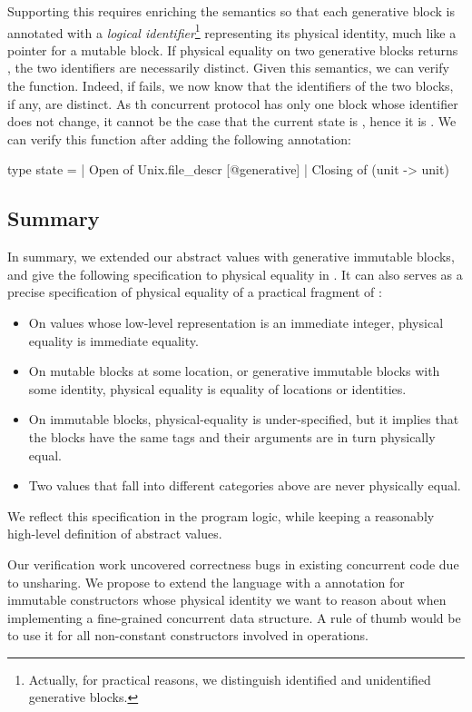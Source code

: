 Supporting this requires enriching the \Zoo semantics so that each generative block is annotated with a \emph{logical identifier}\footnote{Actually, for practical reasons, we distinguish identified and unidentified generative blocks.} representing its physical identity, much like a pointer for a mutable block.
If physical equality on two generative blocks returns , the two identifiers are necessarily distinct.
Given this semantics, we can verify the  function.
Indeed, if  fails, we now know that the identifiers of the two blocks, if any, are distinct.
As th concurrent protocol has only one  block whose identifier does not change, it cannot be the case that the current state is , hence it is .
We can verify this function after adding the following annotation:

\begin{ocamlcode}
type state =
  | Open of Unix.file_descr [@generative]
  | Closing of (unit -> unit)
\end{ocamlcode}

\subsection{Summary}

In summary, we extended our abstract values with generative immutable blocks, and give the following specification to physical equality in \ZooLang. It can also serves as a precise specification of physical equality of a practical fragment of \OCaml:

\begin{itemize}
\item On values whose low-level representation is
  an immediate integer, physical equality is immediate equality.
\item On mutable blocks at some location, or generative immutable blocks with some identity, physical equality is equality of locations or identities.
\item On immutable blocks, physical-equality is under-specified, but it implies that the blocks have the same tags and their arguments are in turn physically equal.
\item Two values that fall into different categories above are never physically equal.
\end{itemize}

We reflect this specification in the \Zoo program logic, while keeping a reasonably high-level definition of abstract values.

Our verification work uncovered correctness bugs in existing \OCaml concurrent code due to unsharing. We propose to extend the language with a \ocamlinline{[@generative]} annotation for immutable constructors whose physical identity we want to reason about when implementing a fine-grained concurrent data structure. A rule of thumb would be to use it for all non-constant constructors involved in  operations.

